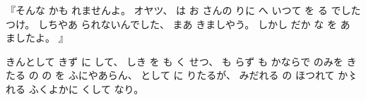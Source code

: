 %
『そんな
かも
れませんよ。
%
オヤツ、
%
は
お
さんの
りに
へ%
いつて
を
る
でしたつけ。
%
しちやあ
られないんでした、
%
まあ
きましやう。
%
しかし
だか
な%
を
あ
ましたよ。
』

%
きんとして
きず
に
して、
%
しき
を
も
く
せつ、
%
も
らず
も
かならで
のみを
きたる
の
の
を
ふにやあらん、
%
として
に
りたるが、
%
みだれる
の
ほつれて
か〻れる%
ふくよかに
くして
なり。%
